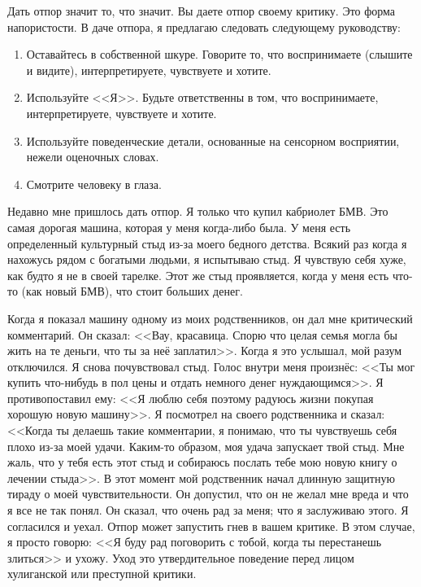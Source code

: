 \documentclass[10pt, fleqn]{article}
\begin{document}

Дать отпор значит то, что значит. Вы даете отпор своему критику. Это форма напористости. В даче отпора, я предлагаю следовать следующему руководству:

\begin{enumerate}
\item Оставайтесь в собственной шкуре. Говорите то, что воспринимаете (слышите и видите), интерпретируете, чувствуете и хотите.
\item Используйте <<Я>>. Будьте ответственны в том, что воспринимаете, интерпретируете, чувствуете и хотите.
\item Используйте поведенческие детали, основанные на сенсорном восприятии, нежели оценочных словах.
\item Смотрите человеку в глаза.
\end{enumerate}

Недавно мне пришлось дать отпор. Я только что купил кабриолет БМВ. Это самая дорогая машина, которая у меня когда-либо была. У меня есть определенный культурный стыд из-за моего бедного детства. Всякий раз когда я нахожусь рядом с богатыми людьми, я испытываю стыд. Я чувствую себя хуже, как будто я не в своей тарелке. Этот же стыд проявляется, когда у меня есть что-то (как новый БМВ), что стоит больших денег.

Когда я показал машину одному из моих родственников, он дал мне критический комментарий. Он сказал: <<Вау, красавица. Спорю что целая семья могла бы жить на те деньги, что ты за неё заплатил>>. Когда я это услышал, мой разум отключился. Я снова почувствовал стыд. Голос внутри меня произнёс: <<Ты мог купить что-нибудь в пол цены и отдать немного денег нуждающимся>>. Я противопоставил ему: <<Я люблю себя поэтому радуюсь жизни покупая хорошую новую машину>>. Я посмотрел на своего родственника и сказал: <<Когда ты делаешь такие комментарии, я понимаю, что ты чувствуешь себя плохо из-за моей удачи. Каким-то образом, моя удача запускает твой стыд. Мне жаль, что у тебя есть этот стыд и собираюсь послать тебе мою новую книгу о лечении стыда>>. В этот момент мой родственник начал длинную защитную тираду о моей чувствительности. Он допустил, что он не желал мне вреда и что я все не так понял. Он сказал, что очень рад за меня; что я заслуживаю этого. Я согласился и уехал. Отпор может запустить гнев в вашем критике. В этом случае, я просто говорю: <<Я буду рад поговорить с тобой, когда ты перестанешь злиться>> и ухожу. Уход это утвердительное поведение перед лицом хулиганской или преступной критики.
\end{document}
